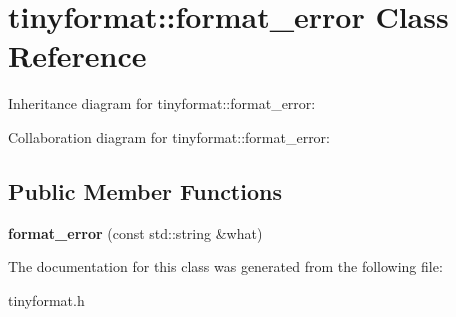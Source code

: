 \hypertarget{classtinyformat_1_1format__error}{}\section{tinyformat\+:\+:format\+\_\+error Class Reference}
\label{classtinyformat_1_1format__error}


Inheritance diagram for tinyformat\+:\+:format\+\_\+error\+:


Collaboration diagram for tinyformat\+:\+:format\+\_\+error\+:
\subsection*{Public Member Functions}
\begin{DoxyCompactItemize}
\item 
\mbox{\label{classtinyformat_1_1format__error_abdf294832c319916a4cb69f631c03bf2}} 
{\bfseries format\+\_\+error} (const std\+::string \&what)
\end{DoxyCompactItemize}


The documentation for this class was generated from the following file\+:\begin{DoxyCompactItemize}
\item 
tinyformat.\+h\end{DoxyCompactItemize}
